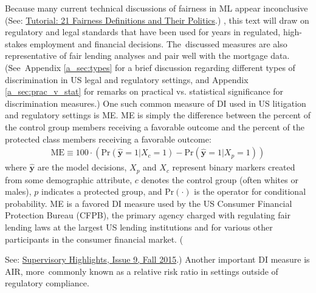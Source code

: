 \documentclass[information,article,accept,moreauthors,pdftex]{Definitions/mdpi}
\begin{document}
{{Because many current technical discussions of fairness in ML appear inconclusive ({See:} 
\href{https://www.youtube.com/watch?v=jIXIuYdnyyk}
{Tutorial: 21 Fairness Definitions and Their Politics}.)%
, this text will draw on regulatory and legal standards that have been used for years in regulated, high-stakes employment and financial decisions. The~discussed measures are also representative of fair lending analyses and pair well with the mortgage data. (See~Appendix \ref{a_sec:types} for a brief discussion regarding different types of discrimination in US legal and regulatory settings, and Appendix \ref{a_sec:prac_v_stat} for remarks on practical vs. statistical significance for discrimination measures.) One such common measure of DI used in US litigation and regulatory settings is ME. ME is simply the difference between the percent of the control group members receiving a favorable outcome and the percent of the protected class members receiving a favorable outcome: 
\begin{equation}
\label{eq:me}
\begin{aligned}
\text{ME} \equiv 100 \cdot (\text{Pr}(\hat{\mathbf{y}} = 1| X_c = 1)  - \text{Pr}(\hat{\mathbf{y}} = 1 | X_p = 1))
\end{aligned}
\end{equation}
 where $\hat{\mathbf{y}}$ are the model decisions, $X_p$ and $X_c$ represent binary markers created from some demographic attribute, $c$ denotes the control group (often whites or males), $p$ indicates a protected group, and $\text{Pr}(\cdot)$ is the operator for conditional probability.  ME is a favored DI measure used by the US Consumer Financial Protection Bureau (CFPB), the primary agency charged with regulating fair lending laws at the largest US lending institutions and for various other participants in the consumer financial market. ({See: 
\href{https://files.consumerfinance.gov/f/201510_cfpb_supervisory-highlights.pdf}
{Supervisory Highlights, Issue 9, Fall 2015}.) %
 Another important DI measure is AIR, more~commonly known as a {relative risk ratio} in settings outside of regulatory compliance.

}}}
\end{document}
